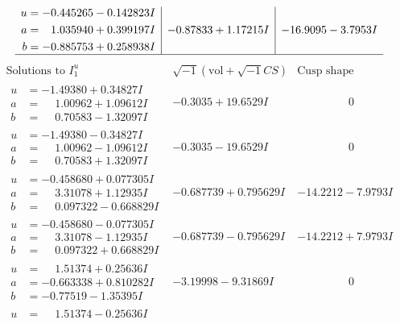 \documentclass[1p]{elsarticle_modified}
\theoremstyle{definition}
\newcommand{\I}{\sqrt{-1}}
\begin{document}
$$\begin{array}{c|c|c}
\begin{aligned}
u &= -0.445265 - 0.142823 I \\
a &= \phantom{-}1.035940 + 0.399197 I \\
b &= -0.885753 + 0.258938 I\end{aligned}
 & -0.87833 + 1.17215 I & -16.9095 - 3.7953 I\\
 \hline 
 \end{array}$$\newpage$$\begin{array}{c|c|c}  
\text{Solutions to }I^u_{1}& \I (\text{vol} + \sqrt{-1}CS) & \text{Cusp shape}\\
 \hline 
\begin{aligned}
u &= -1.49380 + 0.34827 I \\
a &= \phantom{-}1.00962 + 1.09612 I \\
b &= \phantom{-}0.70583 - 1.32097 I\end{aligned}
 & -0.3035 + 19.6529 I & \phantom{-0.000000 } 0 \\ \hline\begin{aligned}
u &= -1.49380 - 0.34827 I \\
a &= \phantom{-}1.00962 - 1.09612 I \\
b &= \phantom{-}0.70583 + 1.32097 I\end{aligned}
 & -0.3035 - 19.6529 I & \phantom{-0.000000 } 0 \\ \hline\begin{aligned}
u &= -0.458680 + 0.077305 I \\
a &= \phantom{-}3.31078 + 1.12935 I \\
b &= \phantom{-}0.097322 - 0.668829 I\end{aligned}
 & -0.687739 + 0.795629 I & -14.2212 - 7.9793 I \\ \hline\begin{aligned}
u &= -0.458680 - 0.077305 I \\
a &= \phantom{-}3.31078 - 1.12935 I \\
b &= \phantom{-}0.097322 + 0.668829 I\end{aligned}
 & -0.687739 - 0.795629 I & -14.2212 + 7.9793 I \\ \hline\begin{aligned}
u &= \phantom{-}1.51374 + 0.25636 I \\
a &= -0.663338 + 0.810282 I \\
b &= -0.77519 - 1.35395 I\end{aligned}
 & -3.19998 - 9.31869 I & \phantom{-0.000000 } 0 \\ \hline\begin{aligned}
u &= \phantom{-}1.51374 - 0.25636 I \\

\end{aligned}
\end{array}$$
\end{document}
